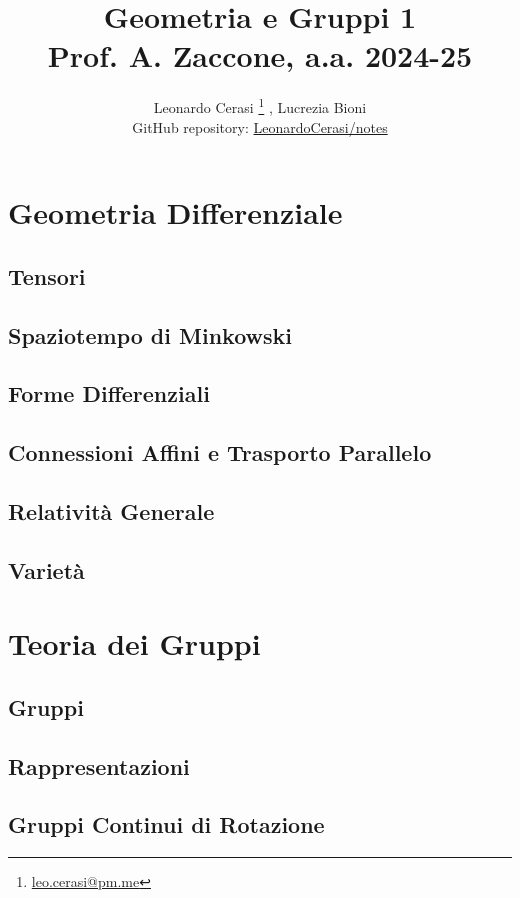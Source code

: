 \documentclass[a4paper, 12pt, openany]{book}
\author{Leonardo Cerasi%
	\thanks{\scriptsize\href{mailto:leonardo.cerasi@studenti.unimi.it}{leo.cerasi@pm.me}}%
	, Lucrezia Bioni\\
	\small GitHub repository: \href{https://github.com/LeonardoCerasi/notes}{LeonardoCerasi/notes}}
\title{\Huge\textbf{Geometria e Gruppi 1} \\ \large Prof. A. Zaccone, a.a. 2024-25}
\begin{document}
\frontmatter

\maketitle

\tableofcontents
\pagestyle{indice}

\mainmatter

\part{Geometria Differenziale}
\pagestyle{body}

\chapter{Tensori}


\chapter{Spaziotempo di Minkowski}


\chapter{Forme Differenziali}


\chapter{Connessioni Affini e Trasporto Parallelo}


\chapter{Relatività Generale}


\chapter{Varietà}


\part{Teoria dei Gruppi}
\pagestyle{body}

\chapter{Gruppi}


\chapter{Rappresentazioni}


\chapter{Gruppi Continui di Rotazione}

\end{document}
